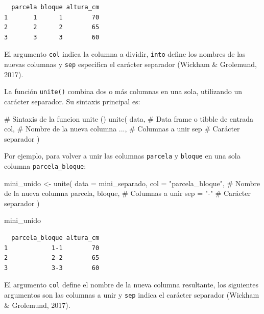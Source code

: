 \documentclass[
  spanish,
  a4paper,
  DIV=11,
  numbers=noendperiod,
  onepage,
  openany]{scrreprt}
\newenvironment{Shaded}{\begin{snugshade}}{\end{snugshade}}
\newcommand{\AttributeTok}[1]{\textcolor[rgb]{0.40,0.45,0.13}{#1}}
\newcommand{\CommentTok}[1]{\textcolor[rgb]{0.37,0.37,0.37}{#1}}
\newcommand{\FunctionTok}[1]{\textcolor[rgb]{0.28,0.35,0.67}{#1}}
\newcommand{\NormalTok}[1]{\textcolor[rgb]{0.00,0.23,0.31}{#1}}
\newcommand{\OtherTok}[1]{\textcolor[rgb]{0.00,0.23,0.31}{#1}}
\newcommand{\StringTok}[1]{\textcolor[rgb]{0.13,0.47,0.30}{#1}}
\begin{document}
\begin{verbatim}
  parcela bloque altura_cm
1       1      1        70
2       2      2        65
3       3      3        60
\end{verbatim}

El argumento \texttt{col} indica la columna a dividir, \texttt{into}
define los nombres de las nuevas columnas y \texttt{sep} especifica el
carácter separador (Wickham \& Grolemund, 2017).

La función \texttt{unite()} combina dos o más columnas en una sola,
utilizando un carácter separador. Su sintaxis principal es:

\begin{Shaded}
\begin{Highlighting}[]
\CommentTok{\# Sintaxis de la funcion unite ()}
\FunctionTok{unite}\NormalTok{(}
\NormalTok{  data,    }\CommentTok{\# Data frame o tibble de entrada}
\NormalTok{  col,     }\CommentTok{\# Nombre de la nueva columna}
\NormalTok{  ...,     }\CommentTok{\# Columnas a unir}
\NormalTok{  sep      }\CommentTok{\# Carácter separador}
\NormalTok{)}
\end{Highlighting}
\end{Shaded}

Por ejemplo, para volver a unir las columnas \texttt{parcela} y
\texttt{bloque} en una sola columna \texttt{parcela\_bloque}:

\begin{Shaded}
\begin{Highlighting}[]
\NormalTok{mini\_unido }\OtherTok{\textless{}{-}} \FunctionTok{unite}\NormalTok{(}
  \AttributeTok{data =}\NormalTok{ mini\_separado,}
  \AttributeTok{col =} \StringTok{"parcela\_bloque"}\NormalTok{, }\CommentTok{\# Nombre de la nueva columna}
\NormalTok{  parcela, bloque,        }\CommentTok{\# Columnas a unir}
  \AttributeTok{sep =} \StringTok{"{-}"}                \CommentTok{\# Carácter separador}
\NormalTok{)}

\NormalTok{mini\_unido}
\end{Highlighting}
\end{Shaded}

\begin{verbatim}
  parcela_bloque altura_cm
1            1-1        70
2            2-2        65
3            3-3        60
\end{verbatim}

El argumento \texttt{col} define el nombre de la nueva columna
resultante, los siguientes argumentos son las columnas a unir y
\texttt{sep} indica el carácter separador (Wickham \& Grolemund, 2017).
\end{document}
